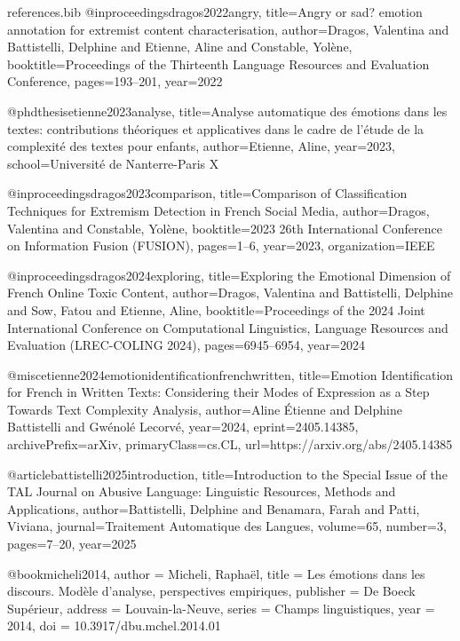 \begin{filecontents*}{references.bib}
@inproceedings{dragos2022angry,
  title={Angry or sad? emotion annotation for extremist content characterisation},
  author={Dragos, Valentina and Battistelli, Delphine and Etienne, Aline and Constable, Yol{\`e}ne},
  booktitle={Proceedings of the Thirteenth Language Resources and Evaluation Conference},
  pages={193--201},
  year={2022}
}

@phdthesis{etienne2023analyse,
  title={Analyse automatique des {\'e}motions dans les textes: contributions th{\'e}oriques et applicatives dans le cadre de l'{\'e}tude de la complexit{\'e} des textes pour enfants},
  author={Etienne, Aline},
  year={2023},
  school={Universit{\'e} de Nanterre-Paris X}
}

@inproceedings{dragos2023comparison,
  title={Comparison of Classification Techniques for Extremism Detection in French Social Media},
  author={Dragos, Valentina and Constable, Yol{\`e}ne},
  booktitle={2023 26th International Conference on Information Fusion (FUSION)},
  pages={1--6},
  year={2023},
  organization={IEEE}
}

@inproceedings{dragos2024exploring,
  title={Exploring the Emotional Dimension of French Online Toxic Content},
  author={Dragos, Valentina and Battistelli, Delphine and Sow, Fatou and Etienne, Aline},
  booktitle={Proceedings of the 2024 Joint International Conference on Computational Linguistics, Language Resources and Evaluation (LREC-COLING 2024)},
  pages={6945--6954},
  year={2024}
}

@misc{etienne2024emotionidentificationfrenchwritten,
  title={Emotion Identification for French in Written Texts: Considering their Modes of Expression as a Step Towards Text Complexity Analysis},
  author={Aline {\'E}tienne and Delphine Battistelli and Gw{\'e}nol{\'e} Lecorv{\'e}},
  year={2024},
  eprint={2405.14385},
  archivePrefix={arXiv},
  primaryClass={cs.CL},
  url={https://arxiv.org/abs/2405.14385}
}

@article{battistelli2025introduction,
  title={Introduction to the Special Issue of the TAL Journal on Abusive Language: Linguistic Resources, Methods and Applications},
  author={Battistelli, Delphine and Benamara, Farah and Patti, Viviana},
  journal={Traitement Automatique des Langues},
  volume={65},
  number={3},
  pages={7--20},
  year={2025}
}

@book{micheli2014,
  author    = {Micheli, Rapha{\"e}l},
  title     = {Les {\'e}motions dans les discours. Mod{\`e}le d'analyse, perspectives empiriques},
  publisher = {De Boeck Sup{\'e}rieur},
  address   = {Louvain-la-Neuve},
  series    = {Champs linguistiques},
  year      = {2014},
  doi       = {10.3917/dbu.mchel.2014.01}
}


\end{filecontents*}

